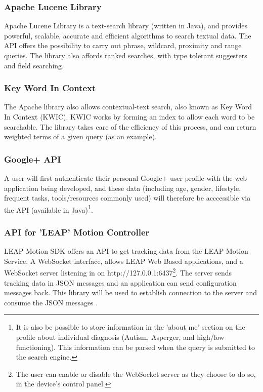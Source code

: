 \documentclass[a4paper, 11pt]{article}
\begin{document}
\subsubsection{Apache Lucene Library}\label{apache}
Apache Lucene Library is a text-search library (written in Java), and provides powerful, scalable, accurate and efficient algorithms to search textual data. The API offers the possibility to carry out phrase, wildcard, proximity and range queries. The library also affords ranked searches, with type tolerant suggesters and field searching.

\subsubsection{Key Word In Context} \label{KWIC} 
The Apache library also allows contextual-text search, also known as Key Word In Context (KWIC)\cite{kwic}. KWIC works by forming an index to allow each word to be searchable. The library takes care of the efficiency of this process, and can return weighted terms of a given query (as an example).


\subsubsection{Google+ API}
A user will first authenticate their personal Google+ user profile with the web application being developed, and these data (including age, gender, lifestyle, frequent tasks, tools/resources commonly used) will therefore be acccessible via the API (available in Java)\footnote{It is also be possible to store information in the 'about me' section on the profile about individual diagnosis (Autism, Asperger, and high/low functioning). This information can be parsed when the query is submitted to the search engine.}. 

\subsubsection{API for 'LEAP' Motion Controller}
LEAP Motion SDK offers an API to get tracking data from the LEAP Motion Service. A WebSocket interface, allows LEAP Web Based applications, and a WebSocket server listening in on http://127.0.0.1:6437\footnote{The user can enable or disable the WebSocket server as they choose to do so, in the device's control panel.}.
The server sends tracking data in JSON messages and an application can send configuration messages back. This library will be used to establish connection to the server and consume the JSON messages \cite{leap}. 
\end{document}
